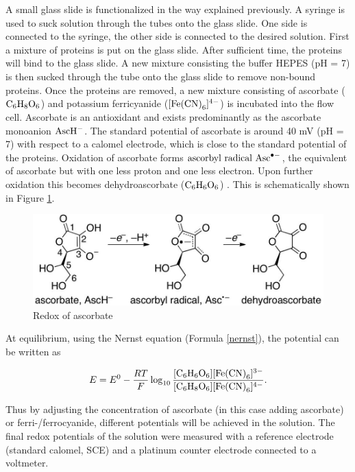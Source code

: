 \documentclass[twoside,single]{lion-msc}
\begin{document}
A small glass slide is functionalized in the way explained previously. A syringe is used to suck solution through the tubes onto the glass slide. One side is connected to the syringe, the other side is connected to the desired solution. First a mixture of proteins is put on the glass slide. After sufficient time, the proteins will bind to the glass slide. A new mixture consisting the buffer HEPES (pH = 7) is then sucked through the tube onto the glass slide to remove non-bound proteins. Once the proteins are removed, a new mixture consisting of ascorbate ($\textup{C}_{6}\textup{H}_{8}\textup{O}_{6}$) and potassium ferricyanide ($[\textup{Fe(CN)}_{6}]^{4-}$) is incubated into the flow cell. Ascorbate is an antioxidant and exists predominantly as the ascorbate monoanion  $\textup{AscH}^{-}$. The standard potential of ascorbate is around 40 mV (pH = 7) with respect to a calomel electrode, which is close to the standard potential of the proteins. Oxidation of ascorbate forms $\textup{ascorbyl radical Asc}^{\bullet  -}$, the equivalent of ascorbate but with one less proton and one less electron. Upon further oxidation this becomes dehydroascorbate ($\textup{C}_{6}\textup{H}_{6}\textup{O}_{6}$) \cite{Warren2010}. This is schematically shown in Figure \ref{redox_asc}.

\begin{figure}[ht!]
\centering
\includegraphics[width=\textwidth]{redox_asc}
\caption{Redox of ascorbate}
\label{redox_asc}
\end{figure}

At equilibrium, using the Nernst equation (Formula \ref{nernst}), the potential can be written as

\begin{equation}
E = E^{0} - \frac{RT}{F} \log_{10} \frac{[\textup{C}_{6}\textup{H}_{6}\textup{O}_{6}][\textup{Fe(CN)}_{6}]^{3-}}{[\textup{C}_{6}\textup{H}_{8}\textup{O}_{6}][\textup{Fe(CN)}_{6}]^{4-}}.
\end{equation}

Thus by adjusting the concentration of ascorbate (in this case adding ascorbate) or ferri-/ferrocyanide, different potentials will be achieved in the solution. The final redox potentials of the solution were measured with a reference electrode (standard calomel, SCE) and a platinum counter electrode connected to a voltmeter.
\end{document}
